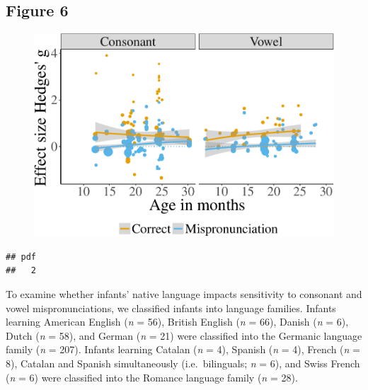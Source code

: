 \documentclass[man]{apa6}
\theoremstyle{definition}
\theoremstyle{definition}
\theoremstyle{definition}
\theoremstyle{remark}
\begin{document}
\subsection{Figure 6}\label{figure-6}

\begin{figure}[htbp]
\centering
\includegraphics{Paper_Analyses_files/figure-latex/PlotCVEffect_cond_age-1.pdf}
\caption{}
\end{figure}

\begin{verbatim}
## pdf 
##   2
\end{verbatim}

To examine whether infants' native language impacts sensitivity to
consonant and vowel mispronunciations, we classified infants into
language families. Infants learning American English (\emph{n} = 56),
British English (\emph{n} = 66), Danish (\emph{n} = 6), Dutch (\emph{n}
= 58), and German (\emph{n} = 21) were classified into the Germanic
language family (\emph{n} = 207). Infants learning Catalan (\emph{n} =
4), Spanish (\emph{n} = 4), French (\emph{n} = 8), Catalan and Spanish
simultaneously (i.e.~bilinguals; \emph{n} = 6), and Swiss French
(\emph{n} = 6) were classified into the Romance language family
(\emph{n} = 28).
\end{document}
